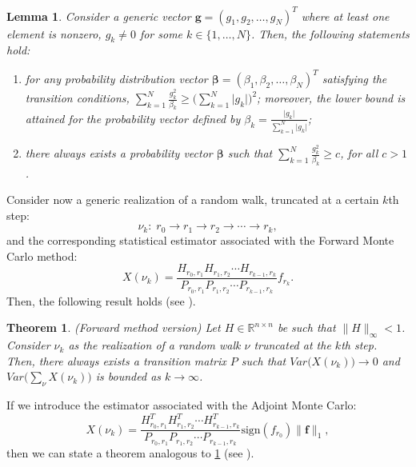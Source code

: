 \documentclass[times]{nlaauth}
\newtheorem{thm}{Theorem}
\newtheorem{lemma}{Lemma}
\begin{document}
\begin{lemma}
 Consider a generic vector
$\mathbf{g}=(g_1,g_2,\ldots,g_N)^T$ where at least
one element is
nonzero, $g_k\ne0$ for some $k\in\{1,\ldots,N\}$. %
Then, the following statements hold:
\begin{enumerate}
 \item[(i)] for any probability distribution vector
$\boldsymbol{\beta}=(\beta_1,\beta_2,\ldots,
\beta_N)^T$ satisfying the
transition conditions, $\displaystyle
\sum_{k=1}^N\frac{g_k^2}{\beta_k}\ge \bigg(\sum_{k=1}^N
\lvert g_k\rvert\bigg)^2$; moreover, the lower bound is attained for
the probability vector defined by $\displaystyle \beta_k=\frac{\lvert
g_k\rvert}{\sum_{k=1}^N \lvert g_k\rvert}$;
\item[(ii)] there always exists a probability vector
$\boldsymbol{\beta}$ such that $\displaystyle
\sum_{k=1}^N\frac{g_k^2}{\beta_k}\ge c$, for all
$c>1$.
\end{enumerate}
\label{lemma1}
\end{lemma}

Consider now a generic realization of a random walk, truncated at a certain $k$th step:
\[
 \nu_k:\; r_0\rightarrow r_1 \rightarrow r_2 \rightarrow \cdots \rightarrow r_k,
\]
and the corresponding statistical estimator associated with the Forward Monte
Carlo method:
\[
 X(\nu_k)=\frac{H_{r_0,r_1}H_{r_1,r_2}\cdots
H_{r_{k-1},r_k}}{P_{r_0,r_1}P_{r_1,r_2}\cdots P_{r_{k-1},r_k}}f_{r_k}.
\]
Then, the following result holds (see \cite{MASC2013}).
\begin{thm}\textit{(Forward method version)}
Let $H\in \mathbb{R}^{n\times n}$ be such that $\lVert H\rVert_{\infty}<1$.
Consider $\nu_k$ as the realization of a random walk $\nu$ truncated at the
$k$th step. Then,
there always exists a
transition matrix $P$ such that
$Var\Big(X(\nu_k)\Big)\rightarrow 0$ and
$Var\Big(\sum_{\nu}X(\nu_k)\Big)$ is bounded as $k\rightarrow \infty$.
\label{for_thm}
\end{thm}

If we introduce the estimator associated with the Adjoint Monte Carlo:
\[
 X(\nu_k)=\frac{H^T_{r_0,r_1}H^T_{r_1,r_2}\cdots
H^T_{r_{k-1},r_k}}{P_{r_0,r_1}P_{r_1,r_2}\cdots
P_{r_{k-1},r_k}}\text{sign}(f_{r_0})\lVert \mathbf{f}\rVert_1,
\]
then we can state a
theorem analogous to \ref{for_thm} (see \cite{MASC2013}).
\end{document}
